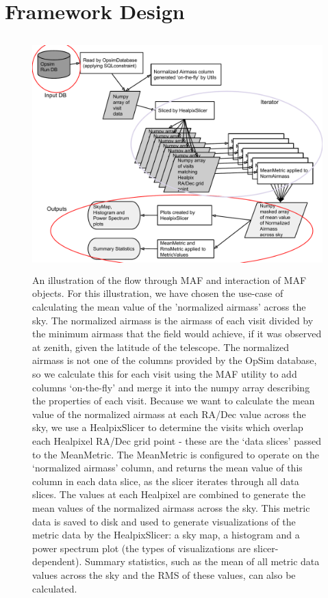 \documentclass[]{spie}  %
\begin{document}
\section{Framework Design}
\label{sec:fwdesign}

\begin{figure}
\centering
\includegraphics[height=9cm]{figures/maf_flowchart}
\caption[]
{ \label{fig:flowchart}
An illustration of the flow through MAF and interaction of MAF
objects. For this illustration, we have chosen the use-case of
calculating the mean value of the 'normalized airmass' across the
sky. The normalized airmass is the airmass of each visit divided by the minimum
airmass that the field would achieve, if it was observed at
zenith, given the latitude of the telescope. The normalized airmass is
not one of the columns provided by the OpSim database, so we calculate
this for each visit using the MAF utility to add columns
`on-the-fly' and merge it into the numpy array describing the
properties of each visit. Because we want to
calculate the mean value of the normalized airmass at each RA/Dec
value across the sky, we use a HealpixSlicer to determine the
visits which overlap each Healpixel RA/Dec grid point - these are
the `data slices' passed to the MeanMetric. The MeanMetric is
configured to operate on the `normalized airmass' column, and returns
the mean value of this column in each data slice, as the slicer
iterates through all data slices. The values at each
Healpixel are combined to generate the mean values of the
normalized airmass across the sky. This metric data is saved to disk and 
used to generate visualizations of the metric data by the
HealpixSlicer: a sky map, a histogram and a power spectrum plot (the types
of visualizations are slicer-dependent). Summary statistics, such as
the mean of all metric data values across the sky and the RMS of these
values, can also be calculated. }
\end{figure}
\end{document}
